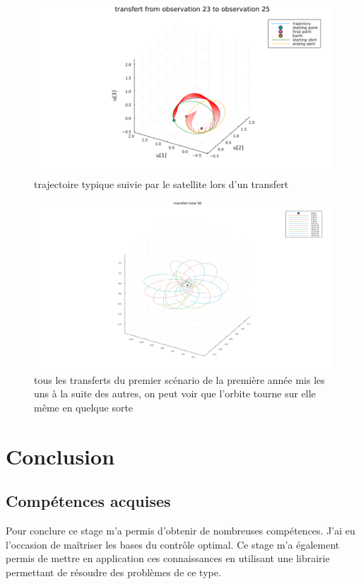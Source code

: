 \documentclass[12pt]{article} %
\begin{document}
		\begin{figure}[H]
			\centering
			\includegraphics[width=0.9\linewidth]{images/Transfert_23_25}
			\caption{trajectoire typique suivie par le satellite lors d'un transfert}
		\end{figure}
		\begin{figure}[H]
			\includegraphics[width=0.9\linewidth]{images/All_transfert_odd_48_50}
			\caption{tous les transferts du premier scénario de la première année mis les uns à la suite des autres, on peut voir que l'orbite tourne sur elle même en quelque sorte}
		\end{figure}
		\newpage
		\section{Conclusion}
		\subsection{Compétences acquises}
		Pour conclure ce stage m'a permis d'obtenir de nombreuses compétences.
		 J'ai eu l'occasion de maîtriser les bases du contrôle optimal. Ce stage m'a également permis de mettre en application ces connaissances en utilisant une librairie permettant de résoudre des problèmes de ce type.
		
\end{document}
